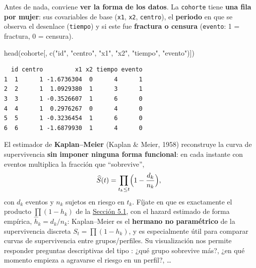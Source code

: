 \documentclass[
  letterpaper,
  DIV=11,
  numbers=noendperiod]{scrartcl}
\newenvironment{Shaded}{\begin{snugshade}}{\end{snugshade}}
\newcommand{\FunctionTok}[1]{\textcolor[rgb]{0.28,0.35,0.67}{#1}}
\newcommand{\NormalTok}[1]{\textcolor[rgb]{0.00,0.23,0.31}{#1}}
\newcommand{\StringTok}[1]{\textcolor[rgb]{0.13,0.47,0.30}{#1}}
\begin{document}
Antes de nada, conviene \textbf{ver la forma de los datos}. La
\texttt{cohorte} tiene \textbf{una fila por mujer}: sus covariables de
base (\texttt{x1}, \texttt{x2}, \texttt{centro}), el \textbf{periodo} en
que se observa el desenlace (\texttt{tiempo}) y si este fue
\textbf{fractura o censura} (\texttt{evento}: 1 = fractura, 0 =
censura).

\begin{Shaded}
\begin{Highlighting}[]
\FunctionTok{head}\NormalTok{(cohorte[, }\FunctionTok{c}\NormalTok{(}\StringTok{"id"}\NormalTok{, }\StringTok{"centro"}\NormalTok{, }\StringTok{"x1"}\NormalTok{, }\StringTok{"x2"}\NormalTok{, }\StringTok{"tiempo"}\NormalTok{, }\StringTok{"evento"}\NormalTok{)])}
\end{Highlighting}
\end{Shaded}

\begin{verbatim}
  id centro         x1 x2 tiempo evento
1  1      1 -1.6736304  0      4      1
2  2      1  1.0929380  1      3      1
3  3      1 -0.3526607  1      6      0
4  4      1  0.2976267  0      4      0
5  5      1 -0.3236454  1      6      0
6  6      1 -1.6879930  1      4      0
\end{verbatim}

El estimador de \textbf{Kaplan--Meier} (Kaplan \& Meier, 1958)
reconstruye la curva de supervivencia \textbf{sin imponer ninguna forma
funcional}: en cada instante con eventos multiplica la fracción que
``sobrevive'', \[
\widehat S(t)=\prod_{t_k\le t}\Bigl(1-\frac{d_k}{n_k}\Bigr),
\] con \(d_k\) eventos y \(n_k\) sujetos en riesgo en \(t_k\). Fíjate en
que es exactamente el producto \(\prod(1-h_k)\) de la
\protect\hyperlink{sec-u15-hazard}{Sección 5.1}, con el hazard estimado
de forma empírica, \(\widehat h_k=d_k/n_k\): Kaplan--Meier es el
\textbf{hermano no paramétrico} de la supervivencia discreta
\(S_t=\prod(1-h_k)\), y es especialmente útil para comparar curvas de
supervivencia entre grupos/perfiles. Su visualización nos permite
responder preguntas descriptivas del tipo : ¿qué grupo sobrevive más?,
¿en qué momento empieza a agravarse el riesgo en un perfil?, \ldots{}
\end{document}
